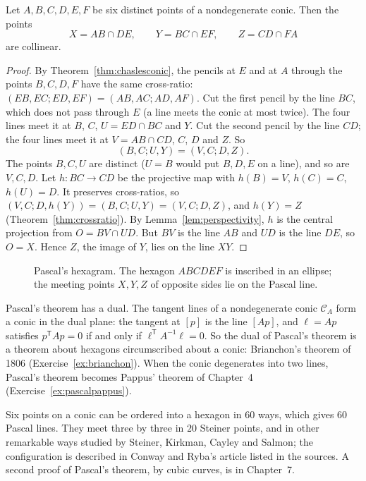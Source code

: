 \begin{theorem}[Pascal]\label{thm:pascal}
Let $A,B,C,D,E,F$ be six distinct points of a nondegenerate conic. Then the points
\[
X=AB\cap DE,\qquad Y=BC\cap EF,\qquad Z=CD\cap FA
\]
are collinear.
\end{theorem}

\begin{proof}
By Theorem~\ref{thm:chaslesconic}, the pencils at $E$ and at $A$ through the points $B,C,D,F$ have the same cross-ratio:
$(EB,EC;ED,EF)=(AB,AC;AD,AF)$. Cut the first pencil by the line $BC$, which does not pass through $E$ (a line meets the conic at most twice). The four
lines meet it at $B$, $C$, $U=ED\cap BC$ and $Y$. Cut the second pencil by the line $CD$; the four lines meet it at $V=AB\cap CD$, $C$, $D$ and $Z$. So
\[
(B,C;U,Y)=(V,C;D,Z).
\]
The points $B,C,U$ are distinct ($U=B$ would put $B,D,E$ on a line), and so are $V,C,D$. Let $h:BC\to CD$ be the projective map with $h(B)=V$, $h(C)=C$,
$h(U)=D$. It preserves cross-ratios, so $(V,C;D,h(Y))=(B,C;U,Y)=(V,C;D,Z)$, and $h(Y)=Z$ (Theorem~\ref{thm:crossratio}). By
Lemma~\ref{lem:perspectivity}, $h$ is the central projection from $O=BV\cap UD$. But $BV$ is the line $AB$ and $UD$ is the line $DE$, so $O=X$. Hence
$Z$, the image of $Y$, lies on the line $XY$.
\end{proof}

\begin{figure}[ht]
\centering
{}
\caption{Pascal's hexagram. The hexagon $ABCDEF$ is inscribed in an ellipse; the meeting points $X,Y,Z$ of opposite sides lie on the Pascal line.}
\label{fig:pascal}
\end{figure}

Pascal's theorem has a dual. The tangent lines of a nondegenerate conic $\mathcal C_A$ form a conic in the dual plane: the tangent at $[p]$ is the
line $[Ap]$, and $\ell=Ap$ satisfies $p^{\mathsf T}Ap=0$ if and only if $\ell^{\mathsf T}A^{-1}\ell=0$. So the dual of Pascal's theorem is a theorem
about hexagons circumscribed about a conic: Brianchon's theorem of 1806 (Exercise~\ref{ex:brianchon}). When the conic degenerates into two lines,
Pascal's theorem becomes Pappus' theorem of Chapter~4 (Exercise~\ref{ex:pascalpappus}).

\begin{remark}
Six points on a conic can be ordered into a hexagon in $60$ ways, which gives $60$ Pascal lines. They meet three by three in $20$ Steiner points,
and in other remarkable ways studied by Steiner, Kirkman, Cayley and Salmon; the configuration is described in Conway and Ryba's article listed in the
sources. A second proof of Pascal's theorem, by cubic curves, is in Chapter~7.
\end{remark}


